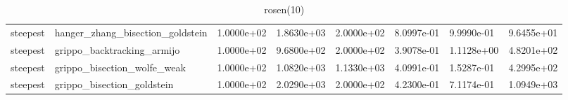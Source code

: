 \documentclass[a4paper,11pt]{article}
\numberwithin{equation}{section} %
\begin{document}
\begin{table}[h!]
{\begin{tabular}{|l|l|l|l|l|l|l|l|}
        steepest & hanger\_zhang\_bisection\_goldstein & 1.0000e+02 & 1.8630e+03 & 2.0000e+02 & 8.0997e-01 & 9.9990e-01 & 9.6455e+01 \\
        steepest & grippo\_backtracking\_armijo & 1.0000e+02 & 9.6800e+02 & 2.0000e+02 & 3.9078e-01 & 1.1128e+00 & 4.8201e+02 \\
        steepest & grippo\_bisection\_wolfe\_weak & 1.0000e+02 & 1.0820e+03 & 1.1330e+03 & 4.0991e-01 & 1.5287e-01 & 4.2995e+02 \\
        steepest & grippo\_bisection\_goldstein & 1.0000e+02 & 2.0290e+03 & 2.0000e+02 & 4.2300e-01 & 7.1174e-01 & 1.0949e+03 \\

\end{tabular}}
\caption{rosen(10)}
\label{table:rosen(10)}
\end{table}
\end{document}
